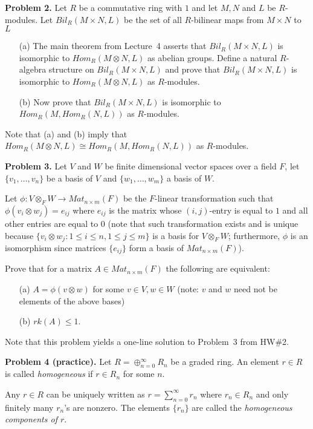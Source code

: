 \documentclass[12pt]{article}
\begin{document}
{\bf Problem 2.} Let $R$ be a commutative ring with $1$ and let 
$M,N$ and $L$ be $R$-modules. Let $Bil_R(M\times N,L)$ be the set of
all $R$-bilinear maps from $M\times N$ to $L$

\begin{itemize}
\item[(a)] The main theorem from Lecture~4 asserts that
$Bil_R(M\times N,L)$ is isomorphic to $Hom_R(M\otimes N,L)$ as abelian groups. Define a natural $R$-algebra structure on $Bil_R(M\times N,L)$ and prove that $Bil_R(M\times N,L)$ is isomorphic to $Hom_R(M\otimes N,L)$ as $R$-modules.

\item[(b)] Now prove that $Bil_R(M\times N,L)$ is isomorphic to
$Hom_R(M,Hom_R(N,L))$ as $R$-modules.
\end{itemize}
Note that (a) and (b) imply that $Hom_R(M\otimes N,L)\cong Hom_R(M,Hom_R(N,L))$ as $R$-modules.
\skv

{\bf Problem 3. } Let $V$ and $W$ be finite dimensional vector spaces
over a field $F$, let $\{v_1,\ldots, v_n\}$ be a basis of $V$
and $\{w_1,\ldots, w_m\}$ a basis of $W$.

Let  $\phi: V\otimes_F W\to Mat_{n\times m}(F)$ be the
$F$-linear transformation such that $\phi(v_i\otimes w_j)=e_{ij}$
where $e_{ij}$ is the matrix whose $(i,j)$-entry is equal to $1$ and all
other entries are equal to $0$ (note that such transformation
exists and is unique because $\{v_i\otimes w_j : 1\leq i\leq n, 1\leq j\leq m\}$
is a basis for $V\otimes_F W$; furthermore, $\phi$ is an isomorphism
since matrices $\{e_{ij}\}$ form a basis of $Mat_{n\times m}(F)$).

Prove that for a matrix $A\in Mat_{n\times m}(F)$ the following are equivalent:
\begin{itemize}
\item[(a)] $A=\phi(v\otimes w)$ for some $v\in V, w\in W$ (note: $v$ and $w$
need not be elements of the above bases)

\item[(b)] $rk(A)\leq 1$.
\end{itemize}
Note that this problem yields a one-line solution to Problem~3 from HW\#2.
\skv

{\bf Problem 4 (practice).} Let $R=\oplus_{n=0}^{\infty} R_n$ be a graded ring.
An element $r\in R$ is called \emph{homogeneous} if $r\in R_n$
for some $n$. 

\sk Any $r\in R$ can be uniquely written as $r=\sum_{n=0}^{\infty} r_n$
where $r_n\in R_n$ and only finitely many $r_n$'s are nonzero. The elements
$\{r_n\}$ are called the \emph{homogeneous components of $r$}.
\end{document}
